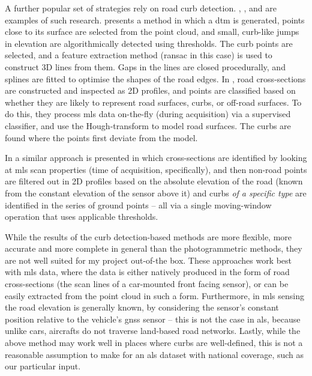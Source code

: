 A further popular set of strategies rely on road curb detection. \cite{vosselman_zhou_2009}, \cite{zhang_2010}, and \cite{yang_etal_2013} are examples of such research. \cite{vosselman_zhou_2009} presents a method in which a \ac{dtm} is generated, points close to its surface are selected from the point cloud, and small, curb-like jumps in elevation are algorithmically detected using thresholds. The curb points are selected, and a feature extraction method (\ac{ransac} in this case) is used to construct 3D lines from them. Gaps in the lines are closed procedurally, and splines are fitted to optimise the shapes of the road edges. In \cite{zhang_2010}, road cross-sections are constructed and inspected as 2D profiles, and points are classified based on whether they are likely to represent road surfaces, curbs, or off-road surfaces. To do this, they process \ac{mls} data on-the-fly (during acquisition) via a supervised classifier, and use the Hough-transform to model road surfaces. The curbs are found where the points first deviate from the model.

In \cite{yang_etal_2013} a similar approach is presented in which cross-sections are identified by looking at \ac{mls} scan properties (time of acquisition, specifically), and then non-road points are filtered out in 2D profiles based on the absolute elevation of the road (known from the constant elevation of the sensor above it) and curbs \textit{of a specific type} are identified in the series of ground points – all via a single moving-window operation that uses applicable thresholds.

While the results of the curb detection-based methods are more flexible, more accurate and more complete in general than the photogrammetric methods, they are not well suited for my project out-of-the box. These approaches work best with \ac{mls} data, where the data is either natively produced in the form of road cross-sections (the scan lines of a car-mounted front facing sensor), or can be easily extracted from the point cloud in such a form. Furthermore, in \ac{mls} sensing the road elevation is generally known, by considering the sensor's constant position relative to the vehicle's \ac{gnss} sensor – this is not the case in \ac{als}, because unlike cars, aircrafts do not traverse land-based road networks. Lastly, while the above method may work well in places where curbs are well-defined, this is not a reasonable assumption to make for an \ac{als} dataset with national coverage, such as our particular input.

